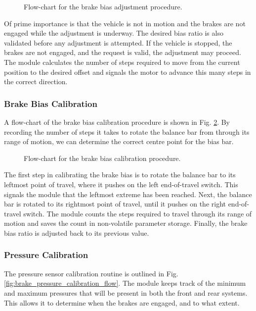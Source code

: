 \begin{figure}[H]
	\centering
	
	\caption{Flow-chart for the brake bias adjustment procedure.}
	\label{fig:design-braking-bias-adjustment}
\end{figure}

Of prime importance is that the vehicle is not in motion and the brakes are not engaged while the adjustment is underway. The desired bias ratio is also validated before any adjustment is attempted. If the vehicle is stopped, the brakes are not engaged, and the request is valid, the adjustment may proceed. The module calculates the number of steps required to move from the current position to the desired offset and signals the motor to advance this many steps in the correct direction.

\subsubsection{Brake Bias Calibration}

A flow-chart of the brake bias calibration procedure is shown in Fig. \ref{fig:brake_bias_calibration_flow}. By recording the number of steps it takes to rotate the balance bar from through its range of motion, we can determine the correct centre point for the bias bar. 

\begin{figure}[H]
	\centering
	
	\caption{Flow-chart for the brake bias calibration procedure.}
	\label{fig:brake_bias_calibration_flow}
\end{figure}

The first step in calibrating the brake bias is to rotate the balance bar to its leftmost point of travel, where it pushes on the left end-of-travel switch. This signals the module that the leftmost extreme has been reached. Next, the balance bar is rotated to its rightmost point of travel, until it pushes on the right end-of-travel switch. The module counts the steps required to travel through its range of motion and saves the count in non-volatile parameter storage. Finally, the brake bias ratio is adjusted back to its previous value.

\subsubsection{Pressure Calibration}

The pressure sensor calibration routine is outlined in Fig. \ref{fig:brake_pressure_calibration_flow}. The module keeps track of the minimum and maximum pressures that will be present in both the front and rear systems. This allows it to determine when the brakes are engaged, and to what extent.

